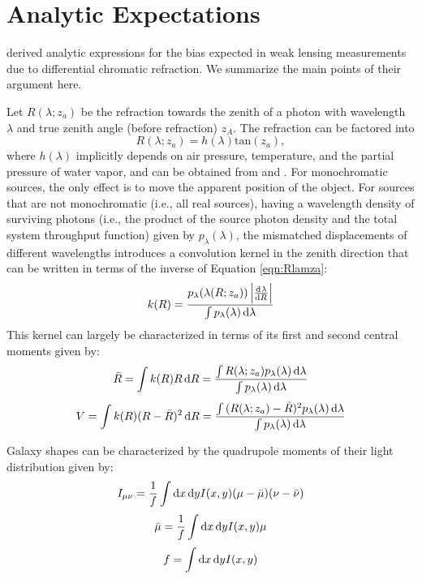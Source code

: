 \documentclass[apj]{emulateapj}
\begin{document}
\section{Analytic Expectations}\label{sec:analytic}
\citet[][hereafter PB12]{Plazas2012} derived analytic expressions for
the bias expected in weak lensing measurements due to differential
chromatic refraction.  We summarize the main points of their argument
here.

Let $R(\lambda; z_a)$ be the refraction towards the zenith of a photon
with wavelength $\lambda$ and true zenith angle (before refraction)
$z_A$.  The refraction can be factored into
\begin{equation}
  R(\lambda; z_a) =  h(\lambda) \mathrm{tan}(z_a),
  \label{eqn:Rlamza}
\end{equation}
where $h(\lambda)$ implicitly depends on air pressure, temperature,
and the partial pressure of water vapor, and can be obtained from
\citet{Edlen1953} and \citet{Coleman1960}.  For monochromatic sources,
the only effect is to move the apparent position of the object.  For
sources that are not monochromatic (i.e., all real sources), having a
wavelength density of surviving photons (i.e., the product of the
source photon density and the total system throughput function) given
by $p_{\lambda}(\lambda)$, the mismatched displacements of different
wavelengths introduces a convolution kernel in the zenith direction
that can be written in terms of the inverse of Equation
\ref{eqn:Rlamza}:
\begin{equation}
  k(R) = \frac{p_\lambda(\lambda(R; z_a)) \left|\od{\lambda}{R}\right|}{\int{p_\lambda(\lambda) \dif{\lambda}}}
  \label{eqn:convker}
\end{equation}
This kernel can largely be characterized in terms of its first and
second central moments given by:
\begin{equation}
  \bar{R} = \int{k(R) R \dif{R} } = \frac{\int{R(\lambda; z_a) p_\lambda(\lambda)\dif{\lambda} }}{\int{p_\lambda(\lambda) \dif{\lambda}}}
  \label{eqn:rbar}
\end{equation}
\begin{equation}
  V = \int{k(R) (R - \bar{R})^2 \dif{R} } = \frac{\int{(R(\lambda; z_a) - \bar{R})^2 p_\lambda(\lambda)\dif{\lambda} }}{\int{p_\lambda(\lambda) \dif{\lambda}}}
  \label{eqn:V}
\end{equation}

Galaxy shapes can be characterized by the quadrupole moments of their
light distribution given by:
\begin{equation}
  I_{\mu \nu} = \frac{1}{f}\int{\dif{x} \dif{y} I(x,y)(\mu - \bar{\mu})(\nu - \bar{\nu})}
\end{equation}
\begin{equation}
  \bar{\mu} = \frac{1}{f}\int{\dif{x} \dif{y} I(x,y)\mu}
\end{equation}
\begin{equation}
  f = \int{\dif{x} \dif{y} I(x,y)}
\end{equation}
\end{document}
